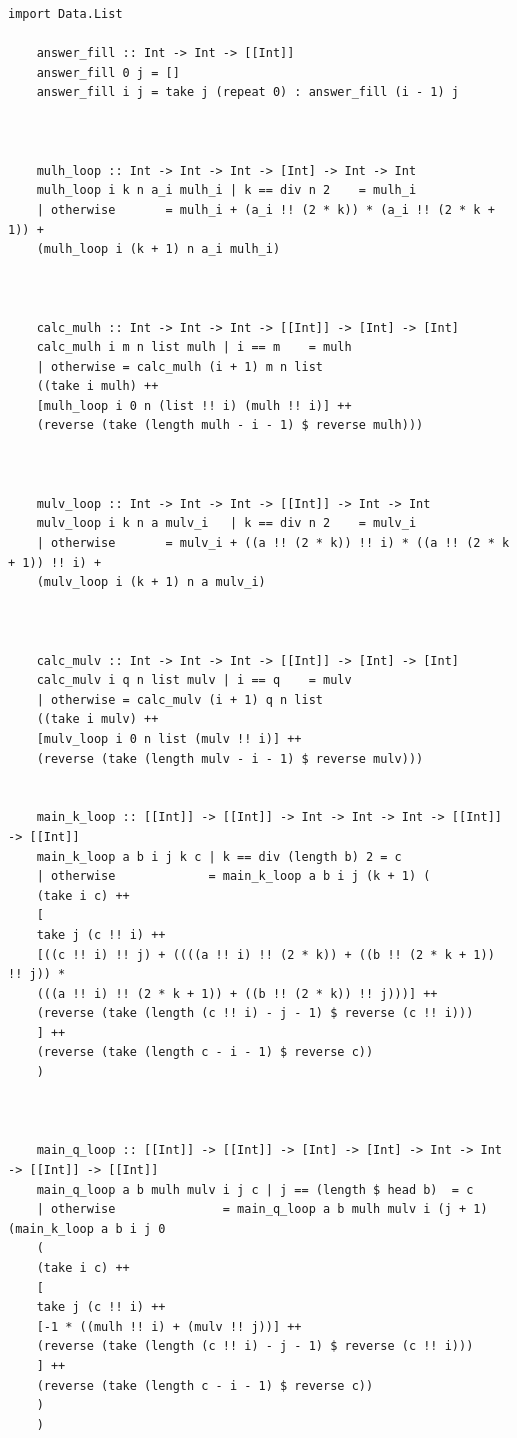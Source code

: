 \documentclass[12pt]{report}
\begin{document}
	\begin{lstlisting}[label=some-code2,caption=Алгоритм Виноградова]
	import Data.List
	
	answer_fill :: Int -> Int -> [[Int]]
	answer_fill 0 j = []
	answer_fill i j = take j (repeat 0) : answer_fill (i - 1) j
	
	
	
	mulh_loop :: Int -> Int -> Int -> [Int] -> Int -> Int
	mulh_loop i k n a_i mulh_i | k == div n 2    = mulh_i
	| otherwise       = mulh_i + (a_i !! (2 * k)) * (a_i !! (2 * k + 1)) +
	(mulh_loop i (k + 1) n a_i mulh_i)
	
	
	
	calc_mulh :: Int -> Int -> Int -> [[Int]] -> [Int] -> [Int]
	calc_mulh i m n list mulh | i == m    = mulh
	| otherwise = calc_mulh (i + 1) m n list 
	((take i mulh) ++
	[mulh_loop i 0 n (list !! i) (mulh !! i)] ++
	(reverse (take (length mulh - i - 1) $ reverse mulh)))
	
	
	
	mulv_loop :: Int -> Int -> Int -> [[Int]] -> Int -> Int
	mulv_loop i k n a mulv_i   | k == div n 2    = mulv_i
	| otherwise       = mulv_i + ((a !! (2 * k)) !! i) * ((a !! (2 * k + 1)) !! i) +
	(mulv_loop i (k + 1) n a mulv_i)
	
	
	
	calc_mulv :: Int -> Int -> Int -> [[Int]] -> [Int] -> [Int]
	calc_mulv i q n list mulv | i == q    = mulv
	| otherwise = calc_mulv (i + 1) q n list 
	((take i mulv) ++
	[mulv_loop i 0 n list (mulv !! i)] ++
	(reverse (take (length mulv - i - 1) $ reverse mulv)))
	
	
	main_k_loop :: [[Int]] -> [[Int]] -> Int -> Int -> Int -> [[Int]] -> [[Int]]
	main_k_loop a b i j k c | k == div (length b) 2 = c
	| otherwise             = main_k_loop a b i j (k + 1) (
	(take i c) ++
	[
	take j (c !! i) ++
	[((c !! i) !! j) + ((((a !! i) !! (2 * k)) + ((b !! (2 * k + 1)) !! j)) * 
	(((a !! i) !! (2 * k + 1)) + ((b !! (2 * k)) !! j)))] ++
	(reverse (take (length (c !! i) - j - 1) $ reverse (c !! i)))
	] ++
	(reverse (take (length c - i - 1) $ reverse c))
	)
	
	
	
	main_q_loop :: [[Int]] -> [[Int]] -> [Int] -> [Int] -> Int -> Int -> [[Int]] -> [[Int]]
	main_q_loop a b mulh mulv i j c | j == (length $ head b)  = c
	| otherwise               = main_q_loop a b mulh mulv i (j + 1) (main_k_loop a b i j 0 
	(
	(take i c) ++
	[
	take j (c !! i) ++
	[-1 * ((mulh !! i) + (mulv !! j))] ++
	(reverse (take (length (c !! i) - j - 1) $ reverse (c !! i)))
	] ++
	(reverse (take (length c - i - 1) $ reverse c))
	)
	)
	

\end{lstlisting}
\end{document}
